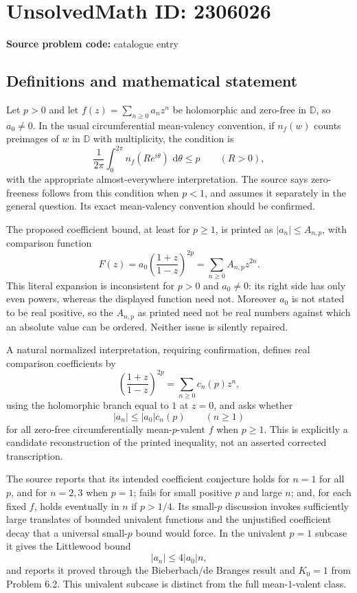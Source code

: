 \documentclass[11pt]{article}
\newcommand{\dd}{\,\mathrm{d}}
\begin{document}
\section*{UnsolvedMath ID: 2306026}
\textbf{Source problem code:} catalogue entry
\subsection{Definitions and mathematical statement}
Let $p>0$ and let $f(z)=\sum_{n\ge0}a_nz^n$ be holomorphic and zero-free in $\mathbb D$, so $a_0\ne0$. In the usual circumferential mean-valency convention, if $n_f(w)$ counts preimages of $w$ in $\mathbb D$ with multiplicity, the condition is
\[
\frac1{2\pi}\int_0^{2\pi}n_f(Re^{i\theta})\,\dd\theta\le p\qquad(R>0),
\]
with the appropriate almost-everywhere interpretation. The source says zero-freeness follows from this condition when $p<1$, and assumes it separately in the general question. Its exact mean-valency convention should be confirmed.

The proposed coefficient bound, at least for $p\ge1$, is printed as $|a_n|\le A_{n,p}$, with comparison function
\[
F(z)=a_0\left(\frac{1+z}{1-z}\right)^{2p}
=\sum_{n\ge0}A_{n,p}z^{2n}.
\]
This literal expansion is inconsistent for $p>0$ and $a_0\ne0$: its right side has only even powers, whereas the displayed function need not. Moreover $a_0$ is not stated to be real positive, so the $A_{n,p}$ as printed need not be real numbers against which an absolute value can be ordered. Neither issue is silently repaired.

A natural normalized interpretation, requiring confirmation, defines real comparison coefficients by
\[
\left(\frac{1+z}{1-z}\right)^{2p}=\sum_{n\ge0}c_n(p)z^n,
\]
using the holomorphic branch equal to $1$ at $z=0$, and asks whether
\[
|a_n|\le |a_0|c_n(p)\qquad(n\ge1)
\]
for all zero-free circumferentially mean-$p$-valent $f$ when $p\ge1$. This is explicitly a candidate reconstruction of the printed inequality, not an asserted corrected transcription.

The source reports that its intended coefficient conjecture holds for $n=1$ for all $p$, and for $n=2,3$ when $p=1$; fails for small positive $p$ and large $n$; and, for each fixed $f$, holds eventually in $n$ if $p>1/4$. Its small-$p$ discussion invokes sufficiently large translates of bounded univalent functions and the unjustified coefficient decay that a universal small-$p$ bound would force. In the univalent $p=1$ subcase it gives the Littlewood bound
\[
|a_n|\le4|a_0|n,
\]
and reports it proved through the Bieberbach/de Branges result and $K_0=1$ from Problem 6.2. This univalent subcase is distinct from the full mean-$1$-valent class.
\end{document}
